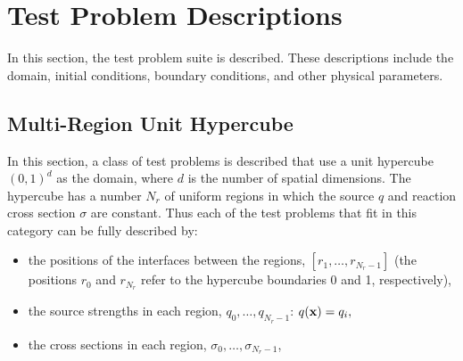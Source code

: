 \section{Test Problem Descriptions}
In this section, the test problem suite is described. These descriptions
include the domain, initial conditions, boundary conditions, and other
physical parameters.
\subsection{Multi-Region Unit Hypercube}\label{sec:multi_region}
In this section, a class of test problems is described that use a unit
hypercube $(0,1)^d$ as the domain, where $d$ is the number of
spatial dimensions. The hypercube has a number $N_r$ of uniform regions
in which the source $q$ and reaction cross section $\sigma$ are
constant. Thus each of the test problems that fit in this
category can be fully described by:
\begin{itemize}
  \item the positions of the interfaces between the regions,
    $[r_1,\ldots,r_{N_r-1}]$ (the positions $r_0$ and $r_{N_r}$
    refer to the hypercube boundaries 0 and 1, respectively),
  \item the source strengths in each region, $q_0,\ldots,q_{N_r-1}$:
    $q(\mathbf{x}) = q_i,\qquad $
  \item the cross sections in each region, $\sigma_0,\ldots,\sigma_{N_r-1}$,
\end{itemize}





